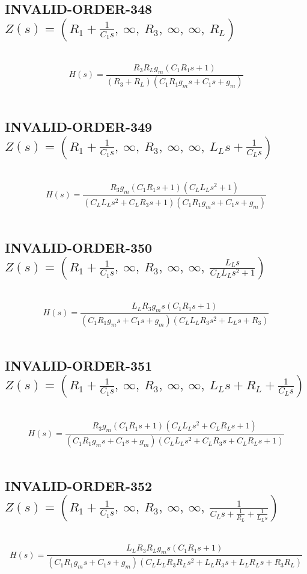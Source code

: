 \documentclass{article}
\begin{document}
\subsection{INVALID-ORDER-348 $Z(s) = \left( R_{1} + \frac{1}{C_{1} s}, \  \infty, \  R_{3}, \  \infty, \  \infty, \  R_{L}\right)$ } \ 
\textbf{\[H(s) = \frac{R_{3} R_{L} g_{m} \left(C_{1} R_{1} s + 1\right)}{\left(R_{3} + R_{L}\right) \left(C_{1} R_{1} g_{m} s + C_{1} s + g_{m}\right)}\] } \ 
\subsection{INVALID-ORDER-349 $Z(s) = \left( R_{1} + \frac{1}{C_{1} s}, \  \infty, \  R_{3}, \  \infty, \  \infty, \  L_{L} s + \frac{1}{C_{L} s}\right)$ } \ 
\textbf{\[H(s) = \frac{R_{3} g_{m} \left(C_{1} R_{1} s + 1\right) \left(C_{L} L_{L} s^{2} + 1\right)}{\left(C_{L} L_{L} s^{2} + C_{L} R_{3} s + 1\right) \left(C_{1} R_{1} g_{m} s + C_{1} s + g_{m}\right)}\] } \ 
\subsection{INVALID-ORDER-350 $Z(s) = \left( R_{1} + \frac{1}{C_{1} s}, \  \infty, \  R_{3}, \  \infty, \  \infty, \  \frac{L_{L} s}{C_{L} L_{L} s^{2} + 1}\right)$ } \ 
\textbf{\[H(s) = \frac{L_{L} R_{3} g_{m} s \left(C_{1} R_{1} s + 1\right)}{\left(C_{1} R_{1} g_{m} s + C_{1} s + g_{m}\right) \left(C_{L} L_{L} R_{3} s^{2} + L_{L} s + R_{3}\right)}\] } \ 
\subsection{INVALID-ORDER-351 $Z(s) = \left( R_{1} + \frac{1}{C_{1} s}, \  \infty, \  R_{3}, \  \infty, \  \infty, \  L_{L} s + R_{L} + \frac{1}{C_{L} s}\right)$ } \ 
\textbf{\[H(s) = \frac{R_{3} g_{m} \left(C_{1} R_{1} s + 1\right) \left(C_{L} L_{L} s^{2} + C_{L} R_{L} s + 1\right)}{\left(C_{1} R_{1} g_{m} s + C_{1} s + g_{m}\right) \left(C_{L} L_{L} s^{2} + C_{L} R_{3} s + C_{L} R_{L} s + 1\right)}\] } \ 
\subsection{INVALID-ORDER-352 $Z(s) = \left( R_{1} + \frac{1}{C_{1} s}, \  \infty, \  R_{3}, \  \infty, \  \infty, \  \frac{1}{C_{L} s + \frac{1}{R_{L}} + \frac{1}{L_{L} s}}\right)$ } \ 
\textbf{\[H(s) = \frac{L_{L} R_{3} R_{L} g_{m} s \left(C_{1} R_{1} s + 1\right)}{\left(C_{1} R_{1} g_{m} s + C_{1} s + g_{m}\right) \left(C_{L} L_{L} R_{3} R_{L} s^{2} + L_{L} R_{3} s + L_{L} R_{L} s + R_{3} R_{L}\right)}\] } \ 
\end{document}
